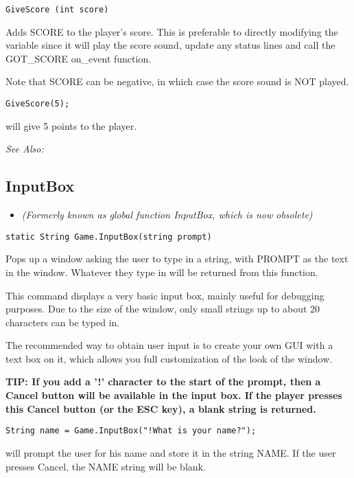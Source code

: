 \begin{verbatim}
GiveScore (int score)
\end{verbatim}
Adds SCORE to the player's score. This is preferable to directly modifying
the variable since it will play the score sound, update any status lines
and call the GOT_SCORE on_event function.

Note that SCORE can be negative, in which case the score sound is NOT played.

\begin{verbatim}
GiveScore(5);
\end{verbatim}
will give 5 points to the player.

\it{See Also:} 


\subsection{InputBox}\label{Game.InputBox}%

\begin{itemize}
\item \it{(Formerly known as global function InputBox, which is now obsolete)}
\end{itemize}

\begin{verbatim}
static String Game.InputBox(string prompt)
\end{verbatim}
Pops up a window asking the user to type in a string, with PROMPT as the
text in the window. Whatever they type in will be returned from this function.

This command displays a very basic input box, mainly useful for debugging
purposes. Due to the size of the window, only small strings up to about 20
characters can be typed in.

The recommended way to obtain user input is to create your own GUI with a text
box on it, which allows you full customization of the look of the window.

\bf{TIP:} If you add a '!' character to the start of the prompt, then a Cancel button will be
available in the input box. If the player presses this Cancel button (or the ESC key),
a blank string is returned.

\begin{verbatim}
String name = Game.InputBox("!What is your name?");
\end{verbatim}
will prompt the user for his name and store it in the string NAME. If the user presses Cancel,
the NAME string will be blank.

